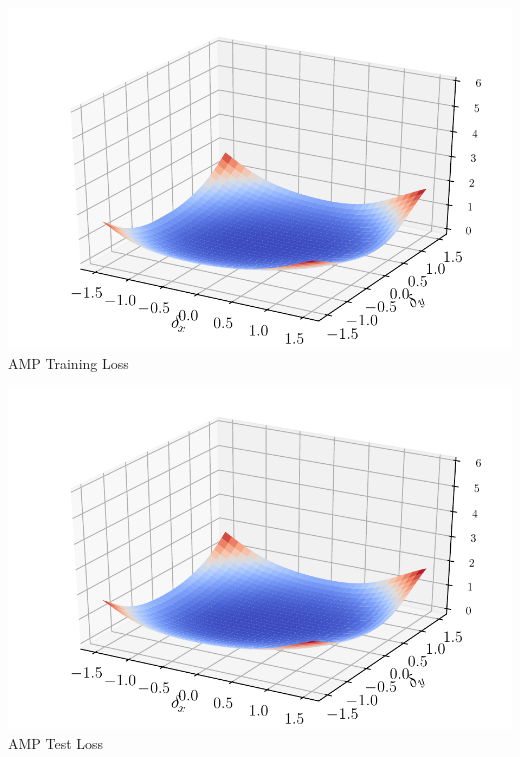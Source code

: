 \documentclass[landscape,a0paper,fontscale=0.3]{baposter}
\begin{document}
\begin{poster}
{\begin{minipage}{0.49\linewidth}
\begin{minipage}{0.5\linewidth}
\centering
\includegraphics[width=.99\linewidth]{figs/svhn_amp_train_loss_landscape3D.pdf}
\vspace{0.5em}
AMP Training Loss
\vspace{1em}
\end{minipage}
\begin{minipage}{0.49\linewidth}
\centering
\includegraphics[width=.99\linewidth]{figs/svhn_amp_test_loss_landscape3D.pdf}
\vspace{0.5em}
AMP Test Loss
\vspace{1em}
\end{minipage}
\end{minipage}
\begin{minipage}{0.5\linewidth}
\begin{minipage}{0.5\linewidth}
\centering

\end{minipage}
\end{minipage}}
\end{poster}
\end{document}

